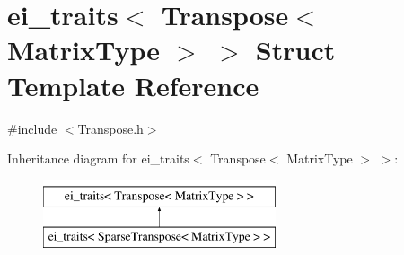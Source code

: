 \hypertarget{structei__traits_3_01_transpose_3_01_matrix_type_01_4_01_4}{\section{ei\-\_\-traits$<$ Transpose$<$ Matrix\-Type $>$ $>$ Struct Template Reference}
\label{structei__traits_3_01_transpose_3_01_matrix_type_01_4_01_4}
}


{\ttfamily \#include $<$Transpose.\-h$>$}

Inheritance diagram for ei\-\_\-traits$<$ Transpose$<$ Matrix\-Type $>$ $>$\-:\begin{figure}[H]
\begin{center}
\leavevmode
\includegraphics[height=2.000000cm]{structei__traits_3_01_transpose_3_01_matrix_type_01_4_01_4}
\end{center}
\end{figure}
